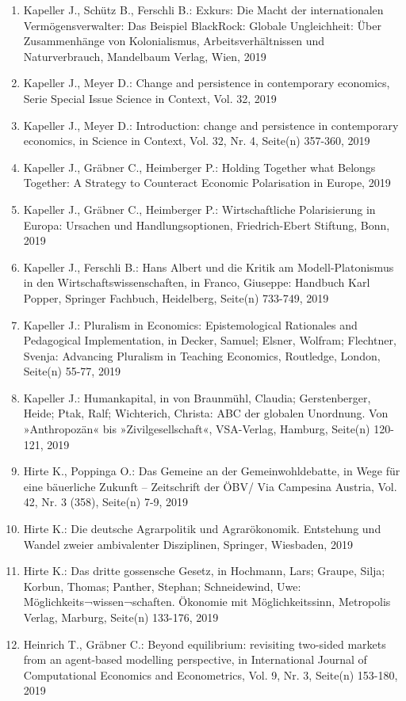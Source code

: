 \begin{enumerate}
	 \item Kapeller J., Schütz B., Ferschli B.: Exkurs: Die Macht der internationalen Vermögensverwalter: Das Beispiel BlackRock: Globale Ungleichheit: Über Zusammenhänge von Kolonialismus, Arbeitsverhältnissen und Naturverbrauch, Mandelbaum Verlag, Wien, 2019
	 \item Kapeller J., Meyer D.: Change and persistence in contemporary economics, Serie Special Issue Science in Context, Vol. 32, 2019
	 \item Kapeller J., Meyer D.: Introduction: change and persistence in contemporary economics, in Science in Context, Vol. 32, Nr. 4, Seite(n) 357-360, 2019
	 \item Kapeller J., Gräbner C., Heimberger P.: Holding Together what Belongs Together: A Strategy to Counteract Economic Polarisation in Europe, 2019
	 \item Kapeller J., Gräbner C., Heimberger P.: Wirtschaftliche Polarisierung in Europa: Ursachen und Handlungsoptionen, Friedrich-Ebert Stiftung, Bonn, 2019
	 \item Kapeller J., Ferschli B.: Hans Albert und die Kritik am Modell-Platonismus in den Wirtschaftswissenschaften, in Franco, Giuseppe: Handbuch Karl Popper, Springer Fachbuch, Heidelberg, Seite(n) 733-749, 2019
	 \item Kapeller J.: Pluralism in Economics: Epistemological Rationales and Pedagogical Implementation, in Decker, Samuel; Elsner, Wolfram; Flechtner, Svenja: Advancing Pluralism in Teaching Economics, Routledge, London, Seite(n) 55-77, 2019
	 \item Kapeller J.: Humankapital, in von Braunmühl, Claudia; Gerstenberger, Heide; Ptak, Ralf; Wichterich, Christa: ABC der globalen Unordnung. Von »Anthropozän« bis »Zivilgesellschaft«, VSA-Verlag, Hamburg, Seite(n) 120-121, 2019
	 \item Hirte K., Poppinga O.: Das Gemeine an der Gemeinwohldebatte, in Wege für eine bäuerliche Zukunft – Zeitschrift der ÖBV/ Via Campesina Austria, Vol. 42, Nr. 3 (358), Seite(n) 7-9, 2019
	 \item Hirte K.: Die deutsche Agrarpolitik und Agrarökonomik. Entstehung und Wandel zweier ambivalenter Disziplinen, Springer, Wiesbaden, 2019
	 \item Hirte K.: Das dritte gossensche Gesetz, in Hochmann, Lars; Graupe, Silja; Korbun, Thomas; Panther, Stephan; Schneidewind, Uwe: Möglichkeits¬wissen¬schaften. Ökonomie mit Möglichkeitssinn, Metropolis Verlag, Marburg, Seite(n) 133-176, 2019
	 \item Heinrich T., Gräbner C.: Beyond equilibrium: revisiting two-sided markets from an agent-based modelling perspective, in International Journal of Computational Economics and Econometrics, Vol. 9, Nr. 3, Seite(n) 153-180, 2019

\end{enumerate}
